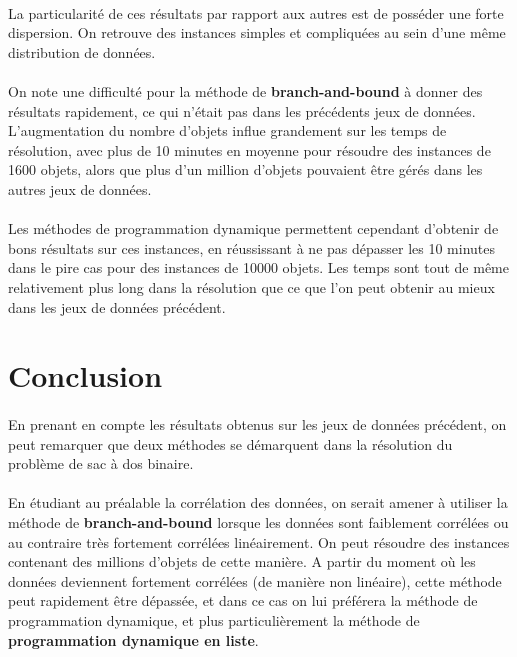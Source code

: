 \documentclass[12pt]{article}
\begin{document}
\paragraph{}La particularité de ces résultats par rapport aux autres est de posséder une forte dispersion. On retrouve des instances simples et compliquées au sein d'une même distribution de données.
\paragraph{}On note une difficulté pour la méthode de \textbf{branch-and-bound} à donner des résultats rapidement, ce qui n'était pas dans les précédents jeux de données. L'augmentation du nombre d'objets influe grandement sur les temps de résolution, avec plus de 10 minutes en moyenne pour résoudre des instances de 1600 objets, alors que plus d'un million d'objets pouvaient être gérés dans les autres jeux de données.
\paragraph{}Les méthodes de programmation dynamique permettent cependant d'obtenir de bons résultats sur ces instances, en réussissant à ne pas dépasser les 10 minutes dans le pire cas pour des instances de 10000 objets. Les temps sont tout de même relativement plus long dans la résolution que ce que l'on peut obtenir au mieux dans les jeux de données précédent.

\section{Conclusion}

\paragraph{}En prenant en compte les résultats obtenus sur les jeux de données précédent, on peut remarquer que deux méthodes se démarquent dans la résolution du problème de sac à dos binaire.

\paragraph{}En étudiant au préalable la corrélation des données, on serait amener à utiliser la méthode de \textbf{branch-and-bound} lorsque les données sont faiblement corrélées ou au contraire très fortement corrélées linéairement. On peut résoudre des instances contenant des millions d'objets de cette manière. 
A partir du moment où les données deviennent fortement corrélées (de manière non linéaire), cette méthode peut rapidement être dépassée, et dans ce cas on lui préférera la méthode de programmation dynamique, et plus particulièrement la méthode de \textbf{programmation dynamique en liste}.
\end{document}
